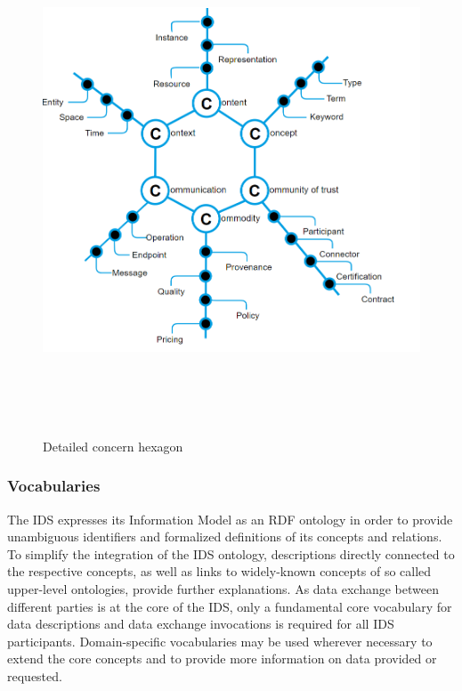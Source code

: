 \begin{figure}[H]
	\begin{Center}
		\includegraphics[width=6.53in,height=5.96in]{./media/image53.png}
		\caption{Detailed concern hexagon}
		\label{fig:Detailed_concern_hexagon}
	\end{Center}
\end{figure}




\subsubsection{Vocabularies}
The IDS expresses its Information Model as an RDF ontology in order to provide unambiguous identifiers and formalized definitions of its concepts and relations. To simplify the integration of the IDS ontology, descriptions directly connected to the respective concepts, as well as links to widely-known concepts of so called upper-level ontologies, provide further explanations. As data exchange between different parties is at the core of the IDS, only a fundamental core vocabulary for data descriptions and data exchange invocations is required for all IDS participants. Domain-specific vocabularies may be used wherever necessary to extend the core concepts and to provide more information on data provided or requested.

